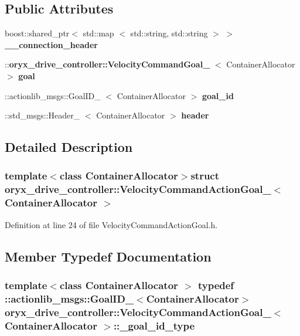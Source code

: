 \subsection*{\-Public \-Attributes}
\begin{DoxyCompactItemize}
\item 
boost\-::shared\-\_\-ptr$<$ std\-::map\*
$<$ std\-::string, std\-::string $>$ $>$ {\bf \-\_\-\-\_\-connection\-\_\-header}
\item 
\-::{\bf oryx\-\_\-drive\-\_\-controller\-::\-Velocity\-Command\-Goal\-\_\-}\*
$<$ \-Container\-Allocator $>$ {\bf goal}
\item 
\-::actionlib\-\_\-msgs\-::\-Goal\-I\-D\-\_\-\*
$<$ \-Container\-Allocator $>$ {\bf goal\-\_\-id}
\item 
\-::std\-\_\-msgs\-::\-Header\-\_\-\*
$<$ \-Container\-Allocator $>$ {\bf header}
\end{DoxyCompactItemize}


\subsection{\-Detailed \-Description}
\subsubsection*{template$<$class Container\-Allocator$>$struct oryx\-\_\-drive\-\_\-controller\-::\-Velocity\-Command\-Action\-Goal\-\_\-$<$ Container\-Allocator $>$}



\-Definition at line 24 of file \-Velocity\-Command\-Action\-Goal.\-h.



\subsection{\-Member \-Typedef \-Documentation}
\subsubsection[{\-\_\-goal\-\_\-id\-\_\-type}]{\setlength{\rightskip}{0pt plus 5cm}template$<$class Container\-Allocator $>$ typedef \-::actionlib\-\_\-msgs\-::\-Goal\-I\-D\-\_\-$<$\-Container\-Allocator$>$ {\bf oryx\-\_\-drive\-\_\-controller\-::\-Velocity\-Command\-Action\-Goal\-\_\-}$<$ \-Container\-Allocator $>$\-::{\bf \-\_\-goal\-\_\-id\-\_\-type}}\label{structoryx__drive__controller_1_1VelocityCommandActionGoal___a9afebb7f58367d48e78455f9d08c74a5}


